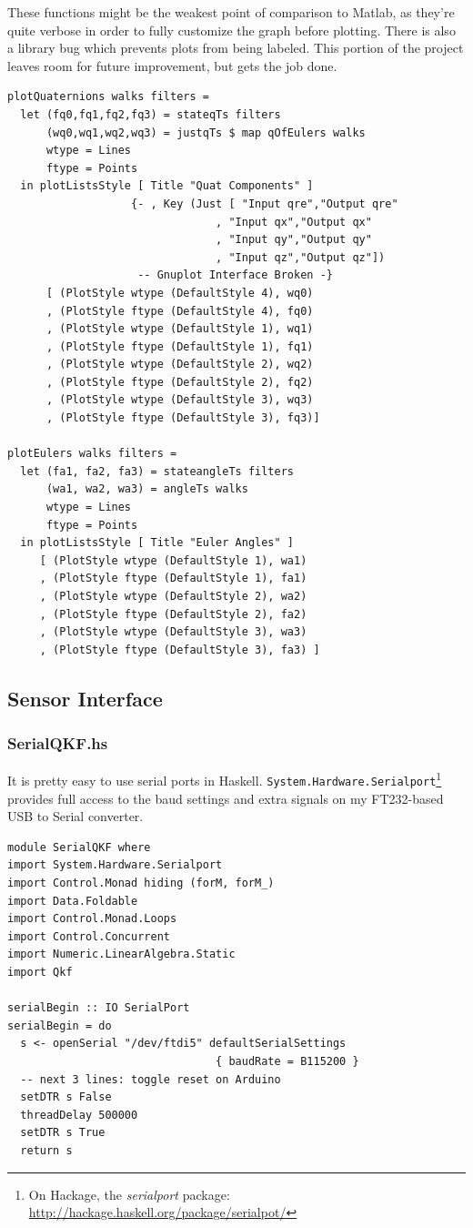 \documentclass[12pt]{report}
\begin{document}
These functions might be the weakest point of comparison to Matlab, as they're quite verbose in order to fully customize the graph before plotting. There is also a library bug which prevents plots from being labeled. This portion of the project leaves room for future improvement, but gets the job done.

\begin{lstlisting}
plotQuaternions walks filters =
  let (fq0,fq1,fq2,fq3) = stateqTs filters
      (wq0,wq1,wq2,wq3) = justqTs $ map qOfEulers walks
      wtype = Lines
      ftype = Points
  in plotListsStyle [ Title "Quat Components" ]
                   {- , Key (Just [ "Input qre","Output qre"
                                , "Input qx","Output qx"
                                , "Input qy","Output qy"
                                , "Input qz","Output qz"]) 
                    -- Gnuplot Interface Broken -}
      [ (PlotStyle wtype (DefaultStyle 4), wq0)
      , (PlotStyle ftype (DefaultStyle 4), fq0) 
      , (PlotStyle wtype (DefaultStyle 1), wq1)
      , (PlotStyle ftype (DefaultStyle 1), fq1)
      , (PlotStyle wtype (DefaultStyle 2), wq2)
      , (PlotStyle ftype (DefaultStyle 2), fq2)
      , (PlotStyle wtype (DefaultStyle 3), wq3)
      , (PlotStyle ftype (DefaultStyle 3), fq3)]
                                                      
plotEulers walks filters =
  let (fa1, fa2, fa3) = stateangleTs filters
      (wa1, wa2, wa3) = angleTs walks
      wtype = Lines
      ftype = Points
  in plotListsStyle [ Title "Euler Angles" ]
     [ (PlotStyle wtype (DefaultStyle 1), wa1)
     , (PlotStyle ftype (DefaultStyle 1), fa1)
     , (PlotStyle wtype (DefaultStyle 2), wa2)
     , (PlotStyle ftype (DefaultStyle 2), fa2)
     , (PlotStyle wtype (DefaultStyle 3), wa3)
     , (PlotStyle ftype (DefaultStyle 3), fa3) ]
\end{lstlisting}

\subsection{Sensor Interface}
\subsubsection{SerialQKF.hs}
It is pretty easy to use serial ports in Haskell. \lstinline$System.Hardware.Serialport$\footnote{On Hackage, the \emph{serialport} package: \url{http://hackage.haskell.org/package/serialpot/}} provides full access to the baud settings and extra signals on my FT232-based USB to Serial converter.
\begin{lstlisting}
module SerialQKF where
import System.Hardware.Serialport
import Control.Monad hiding (forM, forM_)
import Data.Foldable
import Control.Monad.Loops
import Control.Concurrent
import Numeric.LinearAlgebra.Static
import Qkf

serialBegin :: IO SerialPort
serialBegin = do
  s <- openSerial "/dev/ftdi5" defaultSerialSettings 
                                { baudRate = B115200 }
  -- next 3 lines: toggle reset on Arduino
  setDTR s False
  threadDelay 500000
  setDTR s True
  return s

\end{lstlisting}
\end{document}
